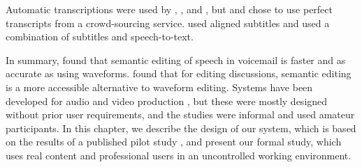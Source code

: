 Automatic transcriptions were used by \citet{Whittaker2004}, \citet{Sivaraman2016}, \citet{Shin2016} and
\citet{Yoon2014}, but \citet{Berthouzoz2012} and \citet{Rubin2013} chose to use perfect transcripts from a
crowd-sourcing service.  \citet{Hyperaudio2016} used aligned subtitles and \citet{Casares2002} used a combination of
subtitles and speech-to-text.

In summary, \citet{Whittaker2004} found that semantic editing of speech in voicemail is faster and as accurate as using
waveforms.  \citet{Sivaraman2016} found that for editing discussions, semantic editing is a more accessible alternative
to waveform editing. Systems have been developed for audio and video production
\citep{Casares2002,Berthouzoz2012,Rubin2013,Shin2016}, but these were mostly designed without prior user requirements,
and the studies were informal and used amateur participants. In this chapter, we describe the design of our system, which
is based on the results of a published pilot study \citep{Baume2015}, and present our formal study, which uses real
content and professional users in an uncontrolled working environment.










